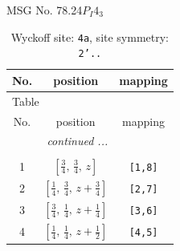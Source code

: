 \documentclass[fleqn,8pt]{jsarticle}
\begin{document}
\setcounter{MaxMatrixCols}{32}

\renewcommand{\tablename}{Table~}
\renewcommand{\figurename}{Figure~}
\begin{center}
\LARGE
MSG No. 78.24\quad$P_{I}4_{3}$
\end{center}
\renewcommand{\arraystretch}{1.2}
\begin{longtable}{ccc}
\caption{Wyckoff site: {\tt 4a}, site symmetry: {\tt 2'..}}
 \\
 \hline \hline
No. & position & mapping \\ \hline \endfirsthead

\multicolumn{2}{l}{\tablename\ \thetable{}} \\
 \hline \hline
No. & position & mapping \\ \hline \endhead

 \hline \hline
\multicolumn{2}{r}{\footnotesize\it continued ...} \\ \endfoot

 \hline \hline
\multicolumn{2}{r}{} \\ \endlastfoot

1 & $\left[ \frac{3}{4},\, \frac{3}{4},\, z \right]$ & {\tt [1,8]} \\ \hline
2 & $\left[ \frac{1}{4},\, \frac{3}{4},\, z + \frac{3}{4} \right]$ & {\tt [2,7]} \\ \hline
3 & $\left[ \frac{3}{4},\, \frac{1}{4},\, z + \frac{1}{4} \right]$ & {\tt [3,6]} \\ \hline
4 & $\left[ \frac{1}{4},\, \frac{1}{4},\, z + \frac{1}{2} \right]$ & {\tt [4,5]} \\
\end{longtable}
\renewcommand{\arraystretch}{1.2}
\end{document}
